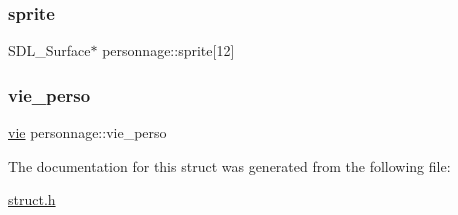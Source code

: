 \subsubsection{\texorpdfstring{sprite}{sprite}}
{\footnotesize\ttfamily S\+D\+L\+\_\+\+Surface$\ast$ personnage\+::sprite\mbox{[}12\mbox{]}}

\mbox{\label{structpersonnage_ac96f4aee44111bc31a7718e5762bf483}} 
\subsubsection{\texorpdfstring{vie\+\_\+perso}{vie\_perso}}
{\footnotesize\ttfamily \hyperlink{structvie}{vie} personnage\+::vie\+\_\+perso}



The documentation for this struct was generated from the following file\+:\begin{DoxyCompactItemize}
\item 
\hyperlink{struct_8h}{struct.\+h}\end{DoxyCompactItemize}
